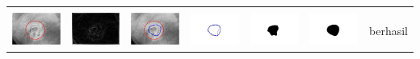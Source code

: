 \begin{table}[H]
\begin{tabular}{|m{0.7in}|m{0.7in}|m{0.7in}|m{0.7in}|m{0.7in}|m{0.7in}|m{0.7in}|}
		&  &  & & & &  \\
		\includegraphics[width=0.7in]{dataset/dataset_3/luka_kuning/ready/21_interp_init.jpg}&
		\includegraphics[width=0.7in]{dataset/dataset_3/luka_kuning/ready/21_interp_ext.jpg}&
		\includegraphics[width=0.7in]{dataset/dataset_3/luka_kuning/ready/21_interp_result.jpg}&
		\includegraphics[width=0.7in]{dataset/dataset_3/luka_kuning/ready/21_gt_r.jpg}&
		\includegraphics[width=0.7in]{dataset/dataset_3/luka_kuning/ready/21_r.jpg}&
		\includegraphics[width=0.7in]{dataset/dataset_3/luka_kuning/ready/21_interp_r.jpg}&
		berhasil\\
		\hline
		

\end{tabular}
\end{table}
